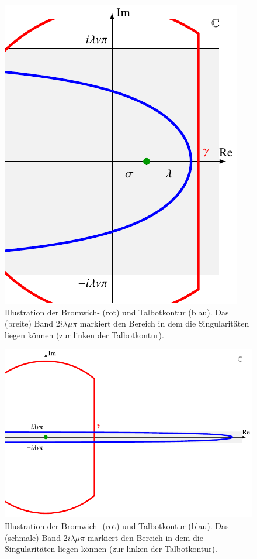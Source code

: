\begin{figure}
\centering
\includegraphics{papers/laplace/images/talbot1.pdf}
\caption{Illustration der Bromwich- (rot) und Talbotkontur (blau). Das (breite) Band $2i\lambda\mu\pi$ markiert den Bereich in dem die Singularitäten liegen können (zur linken der Talbotkontur).
\label{laplace:talbot1}}
\end{figure}

\begin{figure}
\centering
\includegraphics{papers/laplace/images/talbot2.pdf}
\caption{Illustration der Bromwich- (rot) und Talbotkontur (blau). Das (schmale) Band $2i\lambda\mu\pi$ markiert den Bereich in dem die Singularitäten liegen können (zur linken der Talbotkontur).
\label{laplace:talbot2}}
\end{figure}

